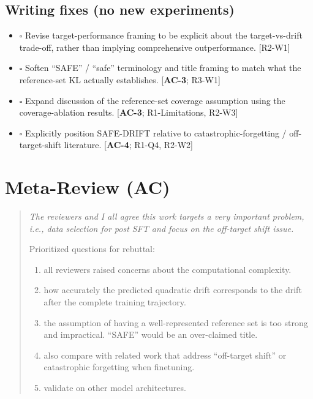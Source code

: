 \documentclass{article}
\begin{document}
\subsection*{Writing fixes (no new experiments)}
\begin{itemize}
    \item $\square$ Revise target-performance framing to be explicit about the target-vs-drift trade-off, rather than implying comprehensive outperformance. [R2-W1]
    \item $\square$ Soften ``SAFE'' / ``safe'' terminology and title framing to match what the reference-set KL actually establishes. [\textbf{AC-3}; R3-W1]
    \item $\square$ Expand discussion of the reference-set coverage assumption using the coverage-ablation results. [\textbf{AC-3}; R1-Limitations, R2-W3]
    \item $\square$ Explicitly position SAFE-DRIFT relative to catastrophic-forgetting / off-target-shift literature. [\textbf{AC-4}; R1-Q4, R2-W2]
\end{itemize}

\section{Meta-Review (AC)}
\label{sec:ac}

\begin{quote}
\itshape
The reviewers and I all agree this work targets a very important problem, i.e., data
selection for post SFT and focus on the off-target shift issue.

Prioritized questions for rebuttal:
\begin{enumerate}
    \item all reviewers raised concerns about the computational complexity.
    \item how accurately the predicted quadratic drift corresponds to the drift after the complete training trajectory.
    \item the assumption of having a well-represented reference set is too strong and impractical. ``SAFE'' would be an over-claimed title.
    \item also compare with related work that address ``off-target shift'' or catastrophic forgetting when finetuning.
    \item validate on other model architectures.
\end{enumerate}
\end{quote}
\end{document}
